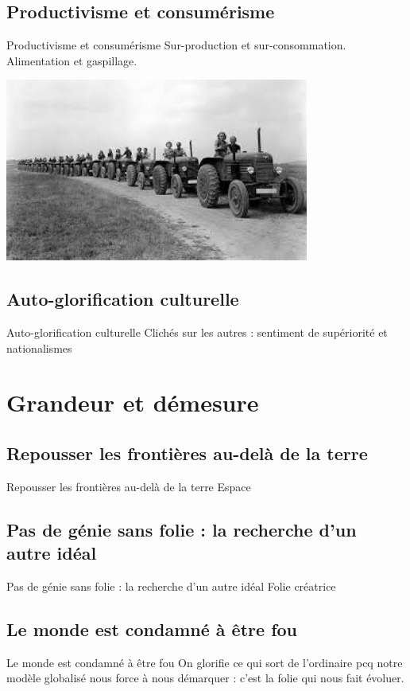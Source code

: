 \documentclass{beamer}
\begin{document}
\subsection{Productivisme et consumérisme}
\begin{frame}{Productivisme et consumérisme}
  Sur-production et sur-consommation.
  Alimentation et gaspillage.
  \begin{center}
    \includegraphics[width=10cm]{../Images/urss.png}
  \end{center}
\end{frame}

\subsection{Auto-glorification culturelle}
\begin{frame}{Auto-glorification culturelle}
  Clichés sur les autres : sentiment de supériorité et nationalismes
\end{frame}


\section{Grandeur et démesure}

\subsection{Repousser les frontières au-delà de la terre}
\begin{frame}{Repousser les frontières au-delà de la terre}
  Espace
\end{frame}

\subsection{Pas de génie sans folie : la recherche d'un autre idéal}
\begin{frame}{Pas de génie sans folie : la recherche d'un autre idéal}
  Folie créatrice
\end{frame}

\subsection{Le monde est condamné à être fou}
\begin{frame}{Le monde est condamné à être fou}
  On glorifie ce qui sort de l'ordinaire pcq notre modèle globalisé nous force à nous démarquer : c'est la folie qui nous fait évoluer.

\end{frame}
\end{document}
